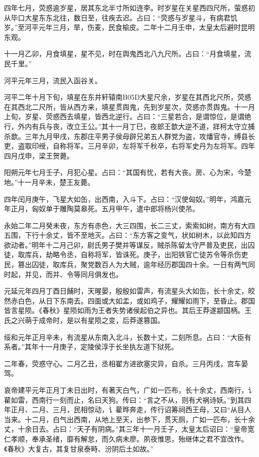 \documentclass[]{article}
\begin{document}
四年七月，荧惑逾岁星，居其东北半寸所如连李。时岁星在关星西四尺所，萤惑初从毕口大星东东北往，数日至，往疾去迟。占曰：``荧惑与岁星斗，有病君饥岁。''至河平元年三月，旱，伤麦，民食榆皮。二年十二月壬申，太皇太后避时昆明东观。

十一月乙卯，月食填星，星不见，时在舆鬼西北八九尺所。占曰：``月食填星，流民千里。''

河平元年三月，流民入函谷关。

河平二年十月下旬，填星在东井轩辕南B05D大星尺余，岁星在其西北尺所，荧惑在其西北二尺所，皆从西方来，填星贯舆鬼，先到岁星次，荧惑亦贯舆鬼。十一月上旬，岁星、荧惑西去填星，皆西北逆行。占曰：``三星若合，是谓惊位，是谓绝行，外内有兵与丧，改立王公。''其十一月丁巳，夜郎王歆大逆不道，牂柯太守立捕杀歆。三年九月甲戌，东郡庄平男子侯母辟兄弟五人群党为盗，攻燔官寺，缚县长吏，盗取印绶，自称将军。三月辛卯，左将军千秋卒，右将军史丹为左将军。四年四月戊申，梁王贺薨。

阳朔元年七月壬子，月犯心星。占曰：``其国有忧，若有大丧。房、心为宋，今楚地。''十一月辛未，楚王友薨。

四年闰月庚午，飞星大如缶，出西南，入斗下。占曰：``汉使匈奴。''明年，鸿嘉元年正月，匈奴单于雕陶莫皋死。五月甲午，遣中郎将杨兴使吊。

永始二年二月癸未夜，东方有赤色，大三四围，长二三丈，索索如树，南方有大四五围，下行十余丈，皆不至地灭。占曰：``东方客之变气，状如树木，以此知四方欲动者。''明年十二月己卯，尉氏男子樊并等谋反，贼杀陈留太守严普及吏民，出囚徒，取库兵，劫略令丞，自称将军，皆诛死。庚子，出阳铁官亡徒苏令等杀伤吏民，篡出囚徒，取库兵，聚党数百人为大贼，逾年经历郡国四十余。一日有两气同时起，并见，而并、令等同月俱发也。

元延元年四月丁酉日餔时，天暒晏，殷殷如雷声，有流星头大如缶，长十余丈，皎然赤白色，从日下东南去。四面或大如盂，或如鸡子，耀耀如雨下，至昏止。郡国皆言星陨。《春秋》星陨如雨为王者失势诸侯起伯之异也。其后王莽遂颛国柄。王氏之兴萌于成帝时，是以有星陨之变，后莽遂篡国。

绥和元年正月辛未，有流星从东南入北斗，长数十丈，二刻所息。占曰：``大臣有系者。''其年十一月庚子，定陵侯淳于长坐执左道下狱死。

二年春，荧惑守心。二月乙丑，丞相翟方进欲塞灾异，自杀。三月丙戌，宫车晏驾。

哀帝建平元年正月丁未日出时，有著天白气，广如一匹布，长十余丈，西南行，讠雚如雷，西南行一刻而止，名曰天狗。传曰：``言之不从，则有犬祸诗妖。''到其四年正月、二月、三月，民相惊动，讠雚晔奔走，传行诏筹祠西王母，又曰``从目人当来。十二月，白气出西南，从地上至天，出参下，贯天厕，广如一匹布，长十余丈，十余日去。占曰：``天子有阴病。''其三年十一月壬子，太皇太后诏曰：``皇帝宽仁孝顺，奉承圣绪，靡有解怠，而久病未廖。夙夜惟思，殆继体之君不宜改作。《春秋》大复古，其复甘泉泰畤、汾阴后土如故。''
\end{document}
